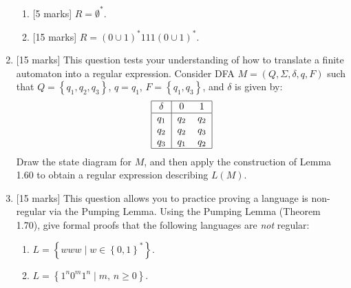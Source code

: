 \documentclass{article}
\newcommand{\set}[1]{{\left\{#1\right\}}}    %
\begin{document}
\begin{enumerate}
\begin{enumerate}
            \item {[5 marks]} $R=\emptyset^*$.\\
            \item {[15 marks]} $R=(0\cup 1)^*111(0\cup 1)^*$.\\
        \end{enumerate}
    \item {[15 marks]} This question tests your understanding of how to translate a finite automaton into a regular expression. Consider DFA $M=(Q,\Sigma,\delta,q,F)$ such that $Q=\set{q_1,q_2,q_3}$, $q=q_1$, $F=\set{q_1,q_3}$, and $\delta$ is given by:
                \[
\begin{tabular}{|c|cc|}
  \hline
  $\delta$ & 0 & 1 \\
  \hline
  $q_1$ & $q_2$ & $q_2$\\
  $q_2$ & $q_2$ & $q_3$\\
  $q_3$ & $q_1$ & $q_2$\\
  \hline
\end{tabular}
        \]
            Draw the state diagram for $M$, and then apply the construction of Lemma 1.60 to obtain a regular expression describing $L(M)$.
    \item {[15 marks]} This question allows you to practice proving a language is non-regular via the Pumping Lemma. Using the Pumping Lemma (Theorem 1.70), give formal proofs that the following languages are \emph{not} regular:
        \begin{enumerate}
            \item $L=\set{www\mid w\in\set{0,1}^*}$.
            \item $L=\set{1^n0^m1^n\mid m\text{, }n\geq 0}$.

\end{enumerate}
\end{enumerate}
\end{document}
